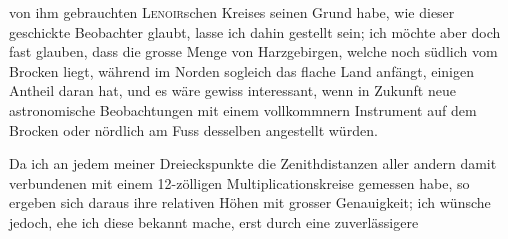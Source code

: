 von ihm gebrauchten \textsc{Lenoir}schen Kreises seinen Grund habe, wie dieser geschickte Beobachter glaubt, lasse ich dahin gestellt sein; ich möchte aber
doch fast glauben, dass die grosse Menge von Harzgebirgen, welche noch
südlich vom Brocken liegt, während im Norden sogleich das flache Land anfängt, einigen Antheil daran hat, und es wäre gewiss interessant, wenn in Zukunft neue astronomische Beobachtungen mit einem vollkommnern Instrument
auf dem Brocken oder nördlich am Fuss desselben angestellt würden.
\par\medskip\noindent\hspace*{\parindent}Da ich an jedem meiner Dreieckspunkte die Zenithdistanzen aller andern
damit verbundenen mit einem 12-zölligen Multiplicationskreise gemessen habe,
so ergeben sich daraus ihre relativen Höhen mit grosser Genauigkeit; ich
wünsche jedoch, ehe ich diese bekannt mache, erst durch eine zuverlässigere

